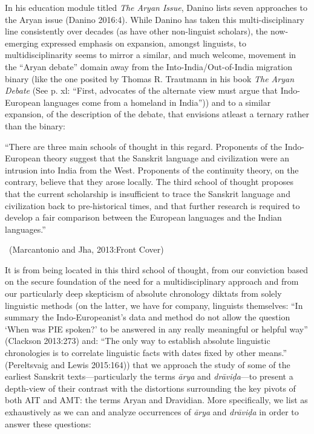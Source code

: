 In his education module titled \textit{The Aryan Issue}, Danino lists seven approaches to the Aryan issue (Danino 2016:4). While Danino has taken this multi-disciplinary line consistently over decades (as have other non-linguist scholars), the now-emerging expressed emphasis on expansion, amongst linguists, to multidisciplinarity seems to mirror a similar, and much welcome, movement in the “Aryan debate” domain away from the Into-India/Out-of-India migration binary (like the one posited by Thomas R. Trautmann in his book \textit{The Aryan Debate} (See p. xl: “First, advocates of the alternate view must argue that Indo-European languages come from a homeland in India”)) and to a similar expansion, of the description of the debate, that envisions atleast a ternary rather than the binary:

\begin{myquote}
“There are three main schools of thought in this regard. Proponents of the Indo-European theory suggest that the Sanskrit language and civilization were an intrusion into India from the West. Proponents of the continuity theory, on the contrary, believe that they arose locally. The third school of thought proposes that the current scholarship is insufficient to trace the Sanskrit language and civilization back to pre-historical times, and that further research is required to develop a fair comparison between the European languages and the Indian languages.”

~\hfill (Marcantonio and Jha, 2013:Front Cover)
\end{myquote}

It is from being located in this third school of thought, from our conviction based on the secure foundation of the need for a multidisciplinary approach and from our particularly deep skepticism of absolute chronology diktats from solely linguistic methods (on the latter, we have for company, linguists themselves: “In summary the Indo-Europeanist’s data and method do not allow the question ‘When was PIE spoken?’ to be answered in any really meaningful or helpful way” (Clackson 2013:273) and: “The only way to establish absolute linguistic chronologies is to correlate linguistic facts with dates fixed by other means.” (Pereltsvaig and Lewis 2015:164)) that we approach the study of some of the earliest Sanskrit texts—particularly the terms \textit{ārya} and \textit{drāviḍa}—to present a depth-view of their contrast with the distortions surrounding the key pivots of both AIT and AMT: the terms Aryan and Dravidian. More specifically, we list as exhaustively as we can and analyze occurrences of \textit{ārya} and \textit{drāviḍa }in order to answer these questions:

